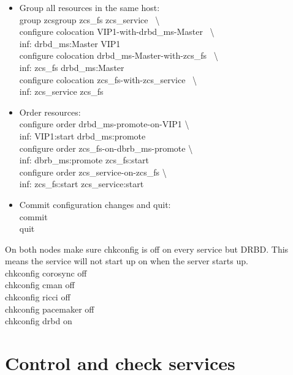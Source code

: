 \documentclass[a4paper, 12pt]{book}
\begin{document}
\begin{itemize}
	\item Group all resources in the same host:\\
		group zcsgroup zcs\_fs zcs\_service \ \textbackslash \\
		configure colocation VIP1-with-drbd\_ms-Master \ \textbackslash \\
			inf: drbd\_ms:Master VIP1 \\
		configure colocation drbd\_ms-Master-with-zcs\_fs \ \textbackslash \\
			inf: zcs\_fs drbd\_ms:Master \\
		configure colocation zcs\_fs-with-zcs\_service \ \textbackslash \\
			inf: zcs\_service zcs\_fs
\end{itemize}

\begin{itemize}
	\item Order resources:\\
		configure order drbd\_ms-promote-on-VIP1 \textbackslash \\
			inf: VIP1:start drbd\_ms:promote\\
		configure order zcs\_fs-on-dbrb\_ms-promote \textbackslash \\
			inf: dbrb\_ms:promote zcs\_fs:start\\
		configure order zcs\_service-on-zcs\_fs \textbackslash \\
			inf: zcs\_fs:start zcs\_service:start\\
\end{itemize}

\begin{itemize}
	\item Commit configuration changes and quit:\\
		commit\\
		quit\\
\end{itemize}


\noindent On both nodes make sure chkconfig is off on every service but DRBD. This means the service will not start up on when the server starts up.\\
	chkconfig corosync off\\
	chkconfig cman off\\
	chkconfig ricci off\\
	chkconfig pacemaker off\\
	chkconfig drbd on


\section{Control and check services}
\label{sec:control}
\end{document}
